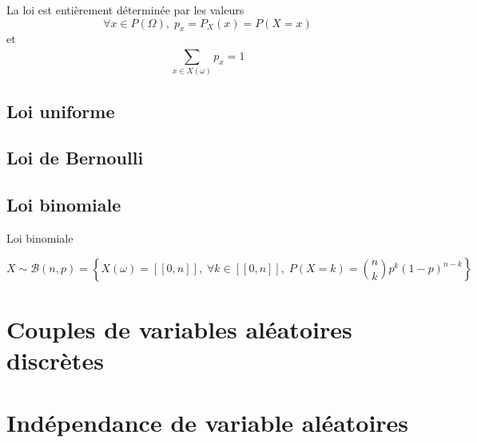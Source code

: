 \begin{Corollary}{}{}
La loi est entièrement déterminée par les valeurs
\begin{equation}
\forall x \in P(\Omega),\;  p_x = P_X(x) = P(X = x)
\end{equation}
et 
\begin{equation}
  \sum_{x \in X(\omega)}^{} p_x = 1
\end{equation}
\end{Corollary}





\subsection{Loi uniforme} %
\label{sub:Loi uniforme}

\subsection{Loi de Bernoulli} %
\label{sub:Loi de Bernoulli}

\subsection{Loi binomiale} %
\label{sub:Loi binomiale}

\begin{Definition}[colbacktitle=red!75!black]{Loi binomiale}{}

\begin{equation}
  X \sim\mathcal{B}(n,p) = \left\{  X(\omega) = [\![0, n]\!], \; \forall k \in [\![0, n]\!], \; P(X= k) = \binom{n}{k} p ^{k} (1-p) ^{n-k} \right\}
\end{equation}
\end{Definition}



\section{Couples de variables aléatoires discrètes} %
\label{sub:Couples de variables aléatoires discrètes}

\section{Indépendance de variable aléatoires} %
\label{sub:Indépendance de variable aléatoires}

